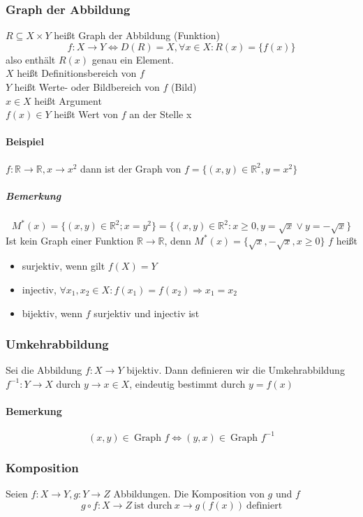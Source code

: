 \documentclass[a4paper]{scrartcl}
\DeclareMathOperator{\Forall}{\forall}%
\begin{document}
\subsubsection{Graph der Abbildung}
\label{sec-2-3-2}
$R\subseteq X\times Y$ heißt Graph der Abbildung (Funktion) \[f:X\rightarrow Y \Leftrightarrow D(R) = X, \Forall x\in X: R(x) = \{f(x)\}\]
also enthält $R(x)$ genau ein Element. \\
    $X$ heißt Definitionsbereich von $f$ \\
    $Y$ heißt Werte- oder Bildbereich von $f$ (Bild) \\
    $x\in X$ heißt Argument \\
    $f(x)\in Y$ heißt Wert von $f$ an der Stelle x
\paragraph{Beispiel}
\label{sec-2-3-2-1}
$f: \mathbb{R}\rightarrow\mathbb{R}, x\rightarrow x^2$ dann ist der Graph von $f = \{(x,y)\in\mathbb{R}^2, y=x^2\}$
\subparagraph{Bemerkung}
\label{sec-2-3-2-1-1}
\[M^{*}(x) = \{(x,y)\in\mathbb{R}^2;x=y^2\} = \{(x,y)\in\mathbb{R}^2: x \geq 0, y=\sqrt{x} \vee y = -\sqrt{x}\}\]
Ist kein Graph einer Funktion $\mathbb{R}\rightarrow\mathbb{R}$, denn $M^{ *}(x) = \{\sqrt{x},-\sqrt{x}, x\geq 0\}$
$f$ heißt
\begin{itemize}
\item surjektiv, wenn gilt $f(X) = Y$
\item injectiv, $\Forall x_1,x_2\in X: f(x_1) = f(x_2) \Rightarrow x_1 = x_2$
\item bijektiv, wenn $f$ surjektiv und injectiv ist
\end{itemize}
\subsubsection{Umkehrabbildung}
\label{sec-2-3-3}
Sei die Abbildung $f: X\rightarrow Y$ bijektiv. Dann definieren wir die Umkehrabbildung $f^{-1}:Y\rightarrow X$ durch $y\rightarrow x\in X$, eindeutig bestimmt durch $y = f(x)$
\paragraph{Bemerkung}
\label{sec-2-3-3-1}
\[(x,y) \in~\text{Graph }f\Leftrightarrow (y,x)\in~\text{Graph }f^{-1}\]
\subsubsection{Komposition}
\label{sec-2-3-4}
Seien $f:X\rightarrow Y, g:Y\rightarrow Z$ Abbildungen. Die Komposition von $g$ und $f$ \[g\circ f: X\rightarrow Z~\text{ist durch}~x\rightarrow g(f(x))~\text{definiert}\]
\end{document}
